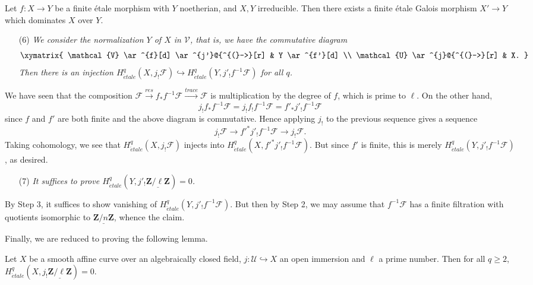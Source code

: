 \begin{exercise}
\label{exercise-finite-etale-under-galois}
Let $f: X \to Y$ be a finite \'etale morphism with $Y$ noetherian, and $X, Y$
irreducible. Then there exists a finite \'etale Galois morphism $X' \to Y$
which dominates $X$ over $Y$.
\end{exercise}

\begin{enumerate}
\item[(6)]
{\it We consider the normalization $Y$ of $X$ in $\mathcal{V}$, that is, we
have the commutative diagram
$$
\xymatrix{
\mathcal{V} \ar^{f}[d] \ar^{j'}@{^{(}->}[r] & Y \ar^{f'}[d] \\
\mathcal{U} \ar^{j}@{^{(}->}[r] & X.
}
$$
Then there is an injection
$H_{\acute{e}tale}^q(X, j_!\mathcal{F}) \hookrightarrow
H_{\acute{e}tale}^q(Y, j'_! f^{-1} \mathcal{F})$ for all $q$.}
\end{enumerate}
We have seen that the composition $\mathcal{F} \xrightarrow{res} f_* f^{-1}
\mathcal{F} \xrightarrow{trace} \mathcal{F}$ is multiplication by the degree of
$f$, which is prime to $\ell$. On the other hand,
$$
j_! f_* f^{-1} \mathcal{F} = j_! f_! f^{-1} \mathcal{F} = f'_* j'_!
f^{-1}\mathcal{F}
$$
since $f$ and $f'$ are both finite and the above diagram is commutative. Hence
applying $j_!$ to the previous sequence gives a sequence
$$
j_! \mathcal{F} \longrightarrow f'^* j'_! f^{-1} \mathcal{F} \longrightarrow
j_! \mathcal{F}.
$$
Taking cohomology, we see that $H_{\acute{e}tale}^q(X, j_!\mathcal{F})$
injects into $H_{\acute{e}tale}^q( X , f'^* j'_! f^{-1} \mathcal{F})$.
But since $f'$ is finite, this
is merely $H_{\acute{e}tale}^q( Y, j'_! f^{-1} \mathcal{F})$, as desired.
\begin{enumerate}
\item[(7)]
{\it It suffices to prove $H_{\acute{e}tale}^q (Y, j'_!
\underline{\mathbf{Z}/\ell\mathbf{Z}}) = 0$.}
\end{enumerate}
By Step 3, it suffices to show vanishing of $H_{\acute{e}tale}^q( Y, j'_! f^{-1}
\mathcal{F})$. But then by Step 2, we may assume that $f^{-1}\mathcal{F}$ has a
finite filtration with quotients isomorphic to
$\underline{\mathbf{Z}/n\mathbf{Z}}$, whence the claim.

\medskip\noindent
Finally, we are reduced to proving the following lemma.

\begin{lemma}
\label{lemma-even-easier}
Let $X$ be a smooth affine curve over an algebraically closed field, $j:
\mathcal{U} \hookrightarrow X$ an open immersion and $\ell$ a prime number.
Then for all $q \geq 2$, $H_{\acute{e}tale}^q(X, j_!
\underline{\mathbf{Z}/\ell\mathbf{Z}}) = 0$.
\end{lemma}

